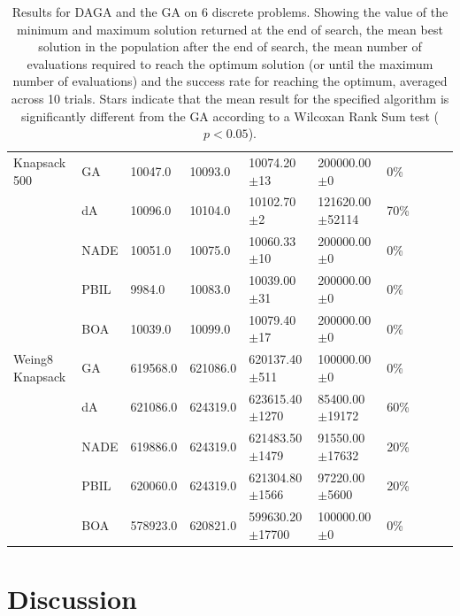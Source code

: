 \documentclass[twoside]{article}
\begin{document}
\begin{table}[t!]
{\begin{tabular}{ | p{1.8cm} | l | l | l | l | l | l | l | l | p{1cm} |}
Knapsack 500 & GA & 10047.0 & 10093.0 & 10074.20 \(\pm\)13 & 200000.00 \(\pm\)0 & 0\%\\
 & dA & 10096.0 & 10104.0 & 10102.70 \(\pm\)2 & 121620.00 \(\pm\)52114 & 70\%\\
 & NADE & 10051.0 & 10075.0 & 10060.33 \(\pm\)10 & 200000.00 \(\pm\)0 & 0\%\\
 & PBIL & 9984.0 & 10083.0 & 10039.00 \(\pm\)31 & 200000.00 \(\pm\)0 & 0\%\\
 & BOA & 10039.0 & 10099.0 & 10079.40 \(\pm\)17 & 200000.00 \(\pm\)0 & 0\%\\\hline
Weing8 Knapsack & GA & 619568.0 & 621086.0 & 620137.40 \(\pm\)511 & 100000.00 \(\pm\)0 & 0\%\\
 & dA & 621086.0 & 624319.0 & 623615.40 \(\pm\)1270 & 85400.00 \(\pm\)19172 & 60\%\\
 & NADE & 619886.0 & 624319.0 & 621483.50 \(\pm\)1479 & 91550.00 \(\pm\)17632 & 20\%\\
 & PBIL & 620060.0 & 624319.0 & 621304.80 \(\pm\)1566 & 97220.00 \(\pm\)5600 & 20\%\\
 & BOA & 578923.0 & 620821.0 & 599630.20 \(\pm\)17700 & 100000.00 \(\pm\)0 & 0\%\\\hline
    \end{tabular}
    }
    \caption{Results for DAGA and the GA on 6 discrete problems. Showing the value of the minimum and maximum solution returned at the end of search, the mean best solution in the population after the end of search, the mean number of evaluations required to reach the optimum solution (or until the maximum number of evaluations) and the success rate for reaching the optimum, averaged across 10 trials. Stars indicate that the mean result for the specified algorithm is significantly different from the GA according to a Wilcoxan Rank Sum test (\(p<0.05\)).}
        \label{table:main_results}

\end{table}


\section{Discussion}
\end{document}

